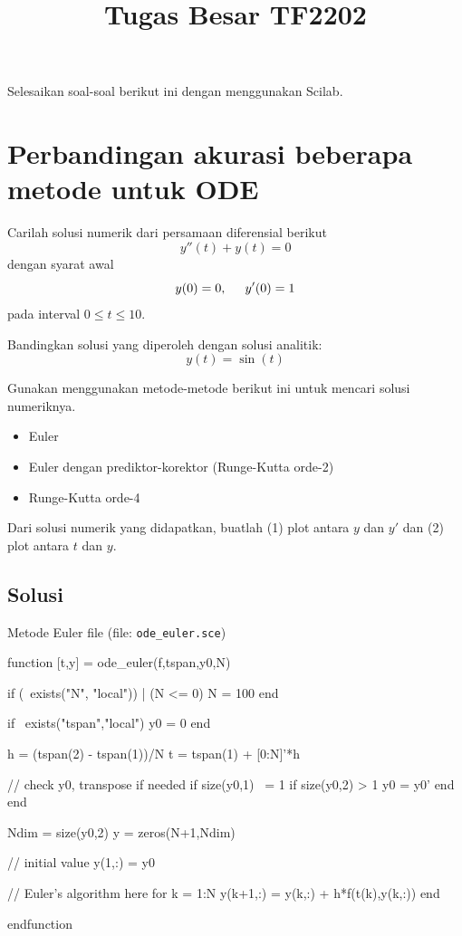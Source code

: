 \documentclass[10pt,bahasa]{article}
\begin{document}
\title{Tugas Besar TF2202}
\date{}
\maketitle

Selesaikan soal-soal berikut ini dengan menggunakan Scilab.

\section{Perbandingan akurasi beberapa metode untuk ODE}

Carilah solusi numerik dari persamaan diferensial berikut
\begin{equation}
y''(t) + y(t) = 0
\end{equation}
dengan syarat awal
\begin{equation}
y(0) = 0, \hspace{0.5cm} y'(0) = 1
\end{equation}
pada interval $0 \leq t \leq 10$.

Bandingkan solusi yang diperoleh dengan solusi analitik:
\begin{equation}
y(t) = \sin(t)
\end{equation}

Gunakan menggunakan metode-metode berikut ini untuk mencari solusi numeriknya.
\begin{itemize}
\item Euler
\item Euler dengan prediktor-korektor (Runge-Kutta orde-2)
\item Runge-Kutta orde-4
\end{itemize}

Dari solusi numerik yang didapatkan, buatlah (1) plot antara $y$ dan $y'$
dan (2) plot antara $t$ dan $y$.

\subsection*{Solusi}

Metode Euler file (file: \texttt{ode\_euler.sce})

\begin{scilabcode}
function [t,y] = ode_euler(f,tspan,y0,N)
    
  if (~exists("N", "local")) | (N <= 0)
    N = 100
  end
    
  if ~exists("tspan","local")
    y0 = 0
  end
    
  h = (tspan(2) - tspan(1))/N
  t = tspan(1) + [0:N]'*h
    
  // check y0, transpose if needed
  if size(y0,1) ~= 1
    if size(y0,2) > 1
      y0 = y0'
    end
  end
  
  Ndim = size(y0,2)
  y = zeros(N+1,Ndim)
    
  // initial value
  y(1,:) = y0
  
  // Euler's algorithm here
  for k = 1:N
    y(k+1,:) = y(k,:) + h*f(t(k),y(k,:))
  end
  
endfunction  
\end{scilabcode}
\end{document}
